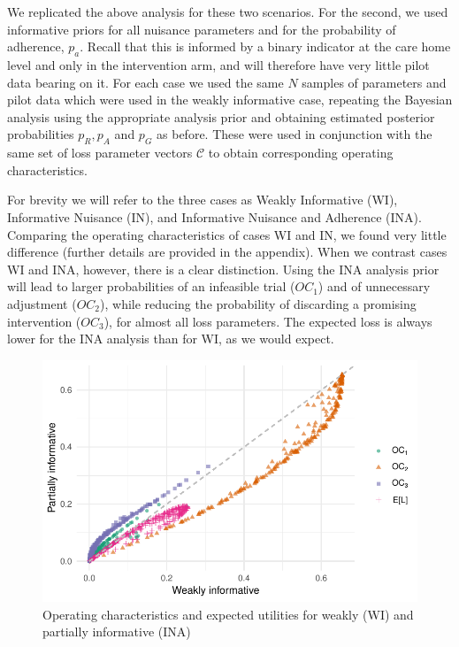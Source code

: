 \documentclass[AMA,STIX1COL]{WileyNJD-v2}
\begin{document}
We replicated the above analysis for these two scenarios. For the second, we used informative priors for all nuisance parameters and for the probability of adherence, $p_a$. Recall that this is informed by a binary indicator at the care home level and only in the intervention arm, and will therefore have very little pilot data bearing on it. For each case we used the same $N$ samples of parameters and pilot data which were used in the weakly informative case, repeating the Bayesian analysis using the appropriate analysis prior and obtaining estimated posterior probabilities $p_R, p_A$ and $p_G$ as before. These were used in conjunction with the same set of loss parameter vectors $\mathcal{C}$ to obtain corresponding operating characteristics.

For brevity we will refer to the three cases as Weakly Informative (WI), Informative Nuisance (IN), and Informative Nuisance and Adherence (INA). Comparing the operating characteristics of cases WI and IN, we found very little difference (further details are provided in the appendix). When we contrast cases WI and INA, however, there is a clear distinction. Using the INA analysis prior will lead to larger probabilities of an infeasible trial ($OC_1$) and of unnecessary adjustment ($OC_2$), while reducing the probability of discarding a promising intervention ($OC_3$), for almost all loss parameters. The expected loss is always lower for the INA analysis than for WI, as we would expect.


\begin{figure}
\centering
\includegraphics[scale=0.8]{./figures/an_prior_comp}
\caption{Operating characteristics and expected utilities for weakly (WI) and partially informative (INA)}
\label{fig:an_prior_comp}
\end{figure}
\end{document}
